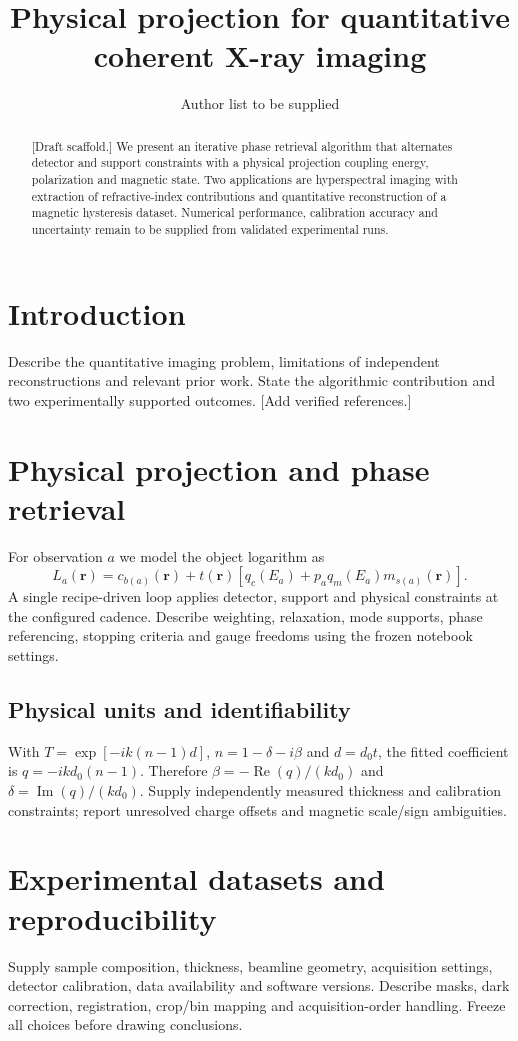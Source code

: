 \documentclass[11pt]{article}
\title{Physical projection for quantitative coherent X-ray imaging}
\author{Author list to be supplied}
\date{}
\begin{document}
\maketitle
\begin{abstract}
[Draft scaffold.] We present an iterative phase retrieval algorithm that alternates detector and support constraints with a physical projection coupling energy, polarization and magnetic state. Two applications are hyperspectral imaging with extraction of refractive-index contributions and quantitative reconstruction of a magnetic hysteresis dataset. Numerical performance, calibration accuracy and uncertainty remain to be supplied from validated experimental runs.
\end{abstract}
\section{Introduction}
Describe the quantitative imaging problem, limitations of independent reconstructions and relevant prior work. State the algorithmic contribution and two experimentally supported outcomes. [Add verified references.]
\section{Physical projection and phase retrieval}
For observation $a$ we model the object logarithm as
\begin{equation}
 L_a(\mathbf r)=c_{b(a)}(\mathbf r)+t(\mathbf r)
 [q_c(E_a)+p_a q_m(E_a)m_{s(a)}(\mathbf r)].
\end{equation}
A single recipe-driven loop applies detector, support and physical constraints at the configured cadence. Describe weighting, relaxation, mode supports, phase referencing, stopping criteria and gauge freedoms using the frozen notebook settings.
\subsection{Physical units and identifiability}
With $T=\exp[-ik(n-1)d]$, $n=1-\delta-i\beta$ and $d=d_0t$, the fitted coefficient is $q=-ikd_0(n-1)$. Therefore $\beta=-\operatorname{Re}(q)/(kd_0)$ and $\delta=\operatorname{Im}(q)/(kd_0)$. Supply independently measured thickness and calibration constraints; report unresolved charge offsets and magnetic scale/sign ambiguities.
\section{Experimental datasets and reproducibility}
Supply sample composition, thickness, beamline geometry, acquisition settings, detector calibration, data availability and software versions. Describe masks, dark correction, registration, crop/bin mapping and acquisition-order handling. Freeze all choices before drawing conclusions.
\end{document}
